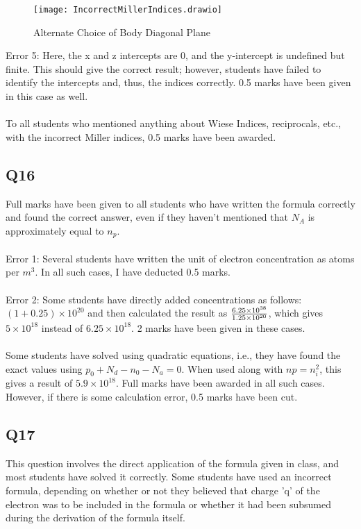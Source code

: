 \documentclass[12pt]{article}\date{}
\begin{document}
\begin{figure}[!ht]
  \centering
  \texttt{[image: IncorrectMillerIndices.drawio]}
\begin{tiny}
\caption{Alternate Choice of Body Diagonal Plane}
\end{tiny}
\end{figure}

\noindent Error 5: Here, the x and z intercepts are 0, and the y-intercept is undefined but finite. This should give the correct result; however, students have failed to identify the intercepts and, thus, the indices correctly. 0.5 marks have been given in this case as well. \\
\\
To all students who mentioned anything about Wiese Indices, reciprocals, etc., with the incorrect Miller indices, 0.5 marks have been awarded. \\

\subsection{Q16}

\noindent Full marks have been given to all students who have written the formula correctly and found the correct answer, even if they haven't mentioned that $N_{A}$ is approximately equal to $n_{p}$. \\ \\
Error 1: Several students have written the unit of electron concentration as atoms per $m^3$. In all such cases, I have deducted 0.5 marks. \\
\\
Error 2: Some students have directly added concentrations as follows: $(1+0.25) \times 10^{20}$ and then calculated the result as ${6.25 \times 10^{38} \over 1.25 \times 10^{20}}$, which gives $5 \times 10^{18}$ instead of $6.25 \times 10^{18}$. 2 marks have been given in these cases. \\ \\
Some students have solved using quadratic equations, i.e., they have found the exact values using $p_0+N_d-n_0-N_a=0$. When used along with $np=n^2_i$, this gives a result of $5.9 \times 10^{18}$. Full marks have been awarded in all such cases. However, if there is some calculation error, 0.5 marks have been cut. \\

\subsection{Q17}
\noindent This question involves the direct application of the formula given in class, and most students have solved it correctly. Some students have used an incorrect formula, depending on whether or not they believed that charge 'q' of the electron was to be included in the formula or whether it had been subsumed during the derivation of the formula itself.
\end{document}
